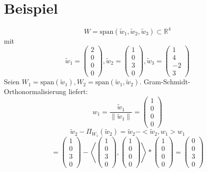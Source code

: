 \documentclass{scrbook}
\begin{document}
\section{Beispiel}
\[W = \text{span}(\tilde{w}_1,\tilde{w}_2,\tilde{w}_3) \subset \mathbb{R}^4\]
mit
\[\tilde{w}_1 = \left(
\begin{array}{c}
2\\0\\0\\0
\end{array}
\right),\tilde{w}_2 = \left(
\begin{array}{c}
1\\0\\3\\0
\end{array}
\right),\tilde{w}_3 = \left(
\begin{array}{c}
1\\4\\-2\\3
\end{array}
\right)\]
Seien $W_1 = \text{span}(\tilde{w}_1),W_2 = \text{span}(\tilde{w}_1, \tilde{w}_2)$. Gram-Schmidt-Orthonormalisierung liefert:
\[w_1 = \frac{\tilde{w}_1}{\|\tilde{w}_1\|} = \left(
\begin{array}{c}
1\\0\\0\\0
\end{array}
\right)\]
\[
\tilde{w}_2 - \Pi_{W_{1}}(\tilde{w}_2) = \tilde{w}_2 -<\tilde{w}_2,w_1>w_1
\]
\[
=\left(
\begin{array}{c}
1\\0\\3\\0
\end{array}
\right)
-
\left<
\left(
\begin{array}{c}
1\\0\\3\\0
\end{array}
\right)
,
\left(
\begin{array}{c}
1\\0\\0\\0
\end{array}
\right)
\right>
*
\left(
\begin{array}{c}
1\\0\\0\\0
\end{array}
\right)
=
\left(
\begin{array}{c}
0\\0\\3\\0
\end{array}
\right)
\]
\end{document}
